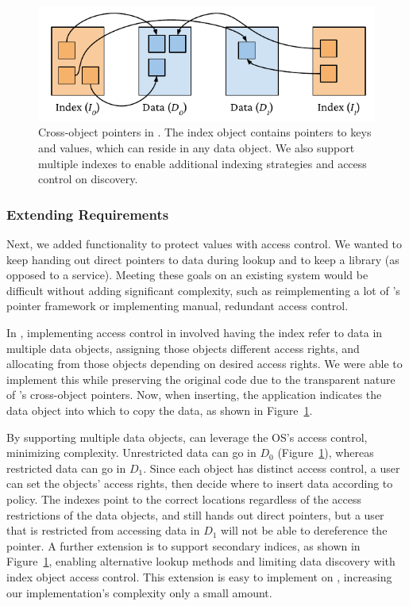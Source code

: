 \begin{figure}
    \centering
    \includegraphics[width=\linewidth]{fig/twzkv}
    \caption[Cross-object pointers]{Cross-object pointers in \nvkv. The index object contains pointers to keys and values,
        which can reside in any data object. We also support multiple indexes to enable additional
        indexing strategies and access control on discovery.}
    \label{fig:twzkv}
\end{figure}




\subsubsection{Extending Requirements}

Next, we added functionality to protect values with access control. We wanted to
keep handing out direct pointers to data during lookup and to
keep \nvkv a library (as opposed to a service). Meeting these goals on an
existing system would be difficult without adding significant
complexity, such as reimplementing a lot of \Twizzler's pointer framework or implementing manual,
redundant access control.

In \Twizzler, implementing access control in \nvkv involved having the index refer to data in
multiple data objects, assigning those objects different access rights, and allocating from
those objects depending on desired access rights. We were
able to implement this while preserving the original code due to the
transparent nature of \Twizzler's cross-object pointers. Now, when inserting, the application
indicates the data object into which to copy the data, as shown in Figure~\ref{fig:twzkv}.

By supporting multiple data objects, \nvkv can leverage the OS's access control,
minimizing complexity. Unrestricted data can go in $D_0$ (Figure~\ref{fig:twzkv}),
whereas restricted data can go in $D_1$. Since each object has distinct
access control, a user can set the objects' access rights, then decide
where to insert data according to policy. The indexes point to the
correct locations regardless of the access restrictions of the data objects, and \nvkv still hands
out direct pointers, but a user that is restricted from accessing data in $D_1$ will not
be able to dereference the pointer. A further extension is to support secondary indices, as shown in
Figure~\ref{fig:twzkv}, enabling alternative lookup methods and limiting data discovery
with index object access control. This extension is easy to implement on \Twizzler,
increasing our implementation's complexity only a small amount.

